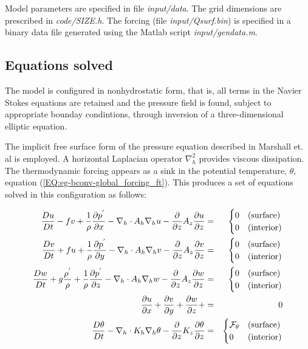 Model parameters are specified in file {\it input/data}. The grid dimensions are
prescribed in {\it code/SIZE.h}. The forcing (file {\it input/Qsurf.bin}) is specified 
in a binary data file generated using the Matlab script {\it input/gendata.m}.

\subsection{Equations solved}

The model is configured in nonhydrostatic form, that is, all terms in the Navier 
Stokes equations are retained and the pressure field is found, subject to appropriate
bounday condintions, through inversion of a three-dimensional elliptic equation. 

The implicit free surface form of the
pressure equation described in Marshall et. al \cite{marshall:97a} is
employed. A horizontal Laplacian operator $\nabla_{h}^2$ provides viscous
dissipation. The thermodynamic forcing appears as a sink in the potential temperature, 
$\theta$, equation (\ref{EQ:eg-bconv-global_forcing_ft}). This produces a set of equations 
solved in this configuration as follows:

\begin{eqnarray}
\label{EQ:eg-bconv-model_equations}
\frac{Du}{Dt} - fv + 
  \frac{1}{\rho}\frac{\partial p^{'}}{\partial x} - 
  \nabla_{h}\cdot A_{h}\nabla_{h}u - 
  \frac{\partial}{\partial z}A_{z}\frac{\partial u}{\partial z} 
 & = &
\begin{cases}
0 & \text{(surface)} \\
0 & \text{(interior)}
\end{cases}
\\
\frac{Dv}{Dt} + fu + 
  \frac{1}{\rho}\frac{\partial p^{'}}{\partial y} - 
  \nabla_{h}\cdot A_{h}\nabla_{h}v - 
  \frac{\partial}{\partial z}A_{z}\frac{\partial v}{\partial z} 
& = &
\begin{cases}
0 & \text{(surface)} \\
0 & \text{(interior)}
\end{cases}
\\
\frac{Dw}{Dt} + g \frac{\rho^{'}}{\rho} + 
  \frac{1}{\rho}\frac{\partial p^{'}}{\partial z} - 
  \nabla_{h}\cdot A_{h}\nabla_{h}w - 
  \frac{\partial}{\partial z}A_{z}\frac{\partial w}{\partial z} 
& = &
\begin{cases}
0 & \text{(surface)} \\
0 & \text{(interior)}
\end{cases}
\\
\frac{\partial u}{\partial x} + 
\frac{\partial v}{\partial y} + 
\frac{\partial w}{\partial z} + 
&=&
0
\\
\frac{D\theta}{Dt} -
 \nabla_{h}\cdot K_{h}\nabla_{h}\theta
 - \frac{\partial}{\partial z}K_{z}\frac{\partial\theta}{\partial z} 
& = &
\begin{cases}
{\cal F}_\theta & \text{(surface)} \\
0 & \text{(interior)}
\end{cases}
\end{eqnarray}


